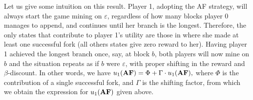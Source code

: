 Let us give some intuition on this result. 
Player 1, adopting the AF strategy, will always start the game mining on $\varepsilon$, regardless of how many blocks player 0 manages to append, and continues until her branch is the longest. Therefore, the only states that contribute to player 1's utility are those in where she made at least one successful fork (all others states give zero reward to her). Having player 1 achieved the longest branch once, say, at block $b$, both players will now mine on $b$ and the situation repeats as if $b$ were $\varepsilon$, with proper shifting in the reward and $\beta$-discount. In other words, we have
$u_1(\text{\rm {\bf AF}}) = \Phi + \Gamma\cdot u_1(\text{\rm {\bf AF}}),$
where $\Phi$ is the contribution of a single successful fork, and $\Gamma$ is the shifting factor, from which we obtain the expression for $u_1(\text{\rm {\bf AF}})$ given above. 

